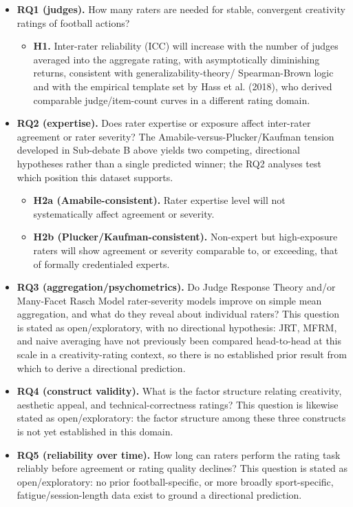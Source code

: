 \documentclass[
  12pt,
]{article}
\providecommand{\tightlist}{%
  \setlength{\itemsep}{0pt}\setlength{\parskip}{0pt}}
\begin{document}
\begin{itemize}
\tightlist
\item
  \textbf{RQ1 (judges).} How many raters are needed for stable,
  convergent creativity ratings of football actions?

  \begin{itemize}
  \tightlist
  \item
    \textbf{H1.} Inter-rater reliability (ICC) will increase with the
    number of judges averaged into the aggregate rating, with
    asymptotically diminishing returns, consistent with
    generalizability-theory/ Spearman-Brown logic and with the empirical
    template set by Hass et al. (2018), who derived comparable
    judge/item-count curves in a different rating domain.
  \end{itemize}
\item
  \textbf{RQ2 (expertise).} Does rater expertise or exposure affect
  inter-rater agreement or rater severity? The
  Amabile-versus-Plucker/Kaufman tension developed in Sub-debate B above
  yields two competing, directional hypotheses rather than a single
  predicted winner; the RQ2 analyses test which position this dataset
  supports.

  \begin{itemize}
  \tightlist
  \item
    \textbf{H2a (Amabile-consistent).} Rater expertise level will not
    systematically affect agreement or severity.
  \item
    \textbf{H2b (Plucker/Kaufman-consistent).} Non-expert but
    high-exposure raters will show agreement or severity comparable to,
    or exceeding, that of formally credentialed experts.
  \end{itemize}
\item
  \textbf{RQ3 (aggregation/psychometrics).} Do Judge Response Theory
  and/or Many-Facet Rasch Model rater-severity models improve on simple
  mean aggregation, and what do they reveal about individual raters?
  This question is stated as open/exploratory, with no directional
  hypothesis: JRT, MFRM, and naive averaging have not previously been
  compared head-to-head at this scale in a creativity-rating context, so
  there is no established prior result from which to derive a
  directional prediction.
\item
  \textbf{RQ4 (construct validity).} What is the factor structure
  relating creativity, aesthetic appeal, and technical-correctness
  ratings? This question is likewise stated as open/exploratory: the
  factor structure among these three constructs is not yet established
  in this domain.
\item
  \textbf{RQ5 (reliability over time).} How long can raters perform the
  rating task reliably before agreement or rating quality declines? This
  question is stated as open/exploratory: no prior football-specific, or
  more broadly sport-specific, fatigue/session-length data exist to
  ground a directional prediction.
\end{itemize}
\end{document}
